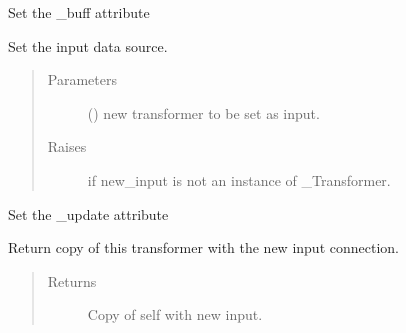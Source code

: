 \documentclass[letterpaper,10pt,english]{sphinxmanual}
\begin{document}
\begin{fulllineitems}
\begin{fulllineitems}
\label{\detokenize{dalio.base:dalio.base.memory.LazyRunner.set_buff}}
Set the \_buff attribute

\end{fulllineitems}


\begin{fulllineitems}
\label{\detokenize{dalio.base:dalio.base.memory.LazyRunner.set_input}}
Set the input data source.
\begin{quote}\begin{description}
\item[{Parameters}] \leavevmode
{} () \textendash{} new transformer to be set as input.

\item[{Raises}] \leavevmode
{} \textendash{} if new\_input is not an instance of \_Transformer.

\end{description}\end{quote}

\end{fulllineitems}


\begin{fulllineitems}
\label{\detokenize{dalio.base:dalio.base.memory.LazyRunner.set_update}}
Set the \_update attribute

\end{fulllineitems}


\begin{fulllineitems}
\label{\detokenize{dalio.base:dalio.base.memory.LazyRunner.with_input}}
Return copy of this transformer with the new input connection.
\begin{quote}\begin{description}
\item[{Returns}] \leavevmode
Copy of self with new input.

\end{description}\end{quote}

\end{fulllineitems}


\end{fulllineitems}
\end{document}
